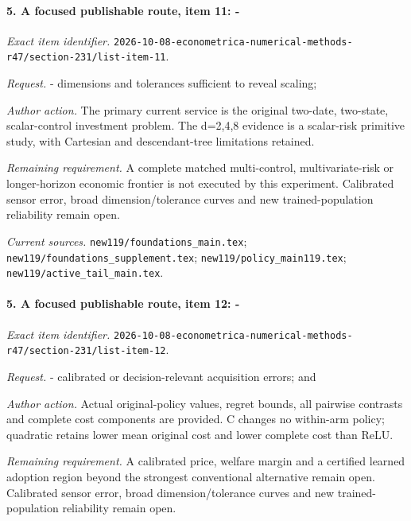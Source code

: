 \paragraph{5. A focused publishable route, item 11: -}

\emph{Exact item identifier.} \nolinkurl{2026-10-08-econometrica-numerical-methods-r47/section-231/list-item-11}.

\par\emph{Request.} - dimensions and tolerances sufficient to reveal scaling;

\par\emph{Author action.} The primary current service is the original two-date, two-state, scalar-control investment problem. The d=2,4,8 evidence is a scalar-risk primitive study, with Cartesian and descendant-tree limitations retained.

\par\emph{Remaining requirement.} A complete matched multi-control, multivariate-risk or longer-horizon economic frontier is not executed by this experiment. Calibrated sensor error, broad dimension/\allowbreak{}tolerance curves and new trained-population reliability remain open.

\par\emph{Current sources.} \nolinkurl{new119/foundations_main.tex}; \nolinkurl{new119/foundations_supplement.tex}; \nolinkurl{new119/policy_main119.tex}; \nolinkurl{new119/active_tail_main.tex}.

\paragraph{5. A focused publishable route, item 12: -}

\emph{Exact item identifier.} \nolinkurl{2026-10-08-econometrica-numerical-methods-r47/section-231/list-item-12}.

\par\emph{Request.} - calibrated or decision-relevant acquisition errors; and

\par\emph{Author action.} Actual original-policy values, regret bounds, all pairwise contrasts and complete cost components are provided. C changes no within-arm policy; quadratic retains lower mean original cost and lower complete cost than ReLU.

\par\emph{Remaining requirement.} A calibrated price, welfare margin and a certified learned adoption region beyond the strongest conventional alternative remain open. Calibrated sensor error, broad dimension/\allowbreak{}tolerance curves and new trained-population reliability remain open.

